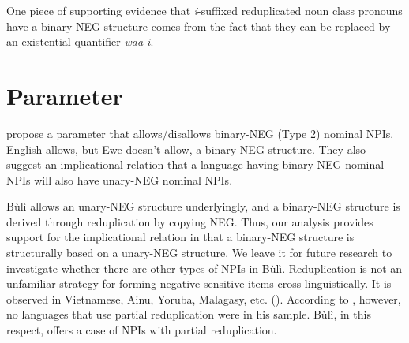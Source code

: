 \documentclass[output=paper,colorlinks,citecolor=brown]{langscibook}
\begin{document}
One piece of supporting evidence that \textit{i}-suffixed reduplicated noun class pronouns have a binary-NEG structure comes from the fact that they can be replaced by an existential quantifier \textit{waa-i}.


\z

\z

\z


\section{Parameter}

\cite{CollinsEtAl2017} propose a parameter that allows/disallows binary-NEG (Type 2) nominal NPIs. English allows, but Ewe doesn't allow, a binary-NEG structure. They also suggest an implicational relation that a language having binary-NEG nominal NPIs will also have unary-NEG nominal NPIs.

 Bùlì allows an unary-NEG structure underlyingly, and a binary-NEG structure is derived through reduplication by copying NEG. Thus, our analysis provides support for the implicational relation in that a binary-NEG structure is structurally based on a unary-NEG structure. We leave it for future research to investigate whether there are other types of NPIs in Bùlì.
Reduplication is not an unfamiliar strategy for forming negative-sensitive items cross-linguistically. It is observed in Vietnamese, Ainu, Yoruba, Malagasy, etc. (\citealt{Haspelmath1997}). According to \cite[179]{Haspelmath1997}, however, no languages that use partial reduplication were in his sample. Bùlì, in this respect, offers a case of NPIs with partial reduplication.
\end{document}
